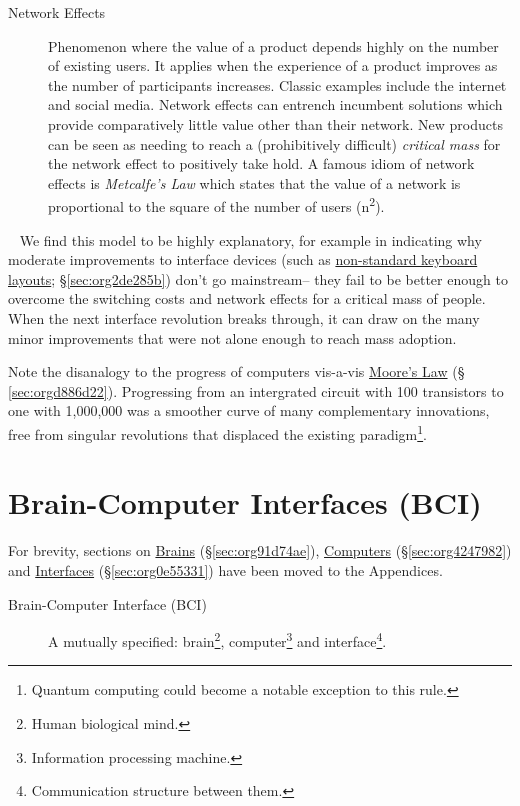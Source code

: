 \documentclass[logo,bsc,singlespacing,parskip]{infthesis}
\begin{document}
\begin{mdframed}
\begin{description}
\item[{Network Effects\label{network effects}}] Phenomenon where the value of a product depends highly on the number of existing users.
It applies when the experience of a product improves as the number of participants increases.
Classic examples include the internet and social media.
Network effects can entrench incumbent solutions which provide comparatively little value other than their network.
New products can be seen as needing to reach a (prohibitively difficult) \emph{critical mass} for the network effect to positively take hold.
A famous idiom of network effects is \emph{Metcalfe's Law} which states that the value of a network is proportional to the square of the number of users (n\textsuperscript{2}).
\end{description}
\end{mdframed}
~
We find this model to be highly explanatory, for example in indicating why moderate improvements to interface devices (such as \hyperref[sec:org2de285b]{non-standard keyboard layouts}; \S \ref{sec:org2de285b}) don't go mainstream-- they  fail to be better enough to overcome the switching costs and network effects for a critical mass of people.
When the next interface revolution breaks through, it can draw on the many minor improvements that were not alone enough to reach mass adoption.

Note the disanalogy to the progress of computers vis-a-vis \hyperref[sec:orgd886d22]{Moore's Law} (§ \ref{sec:orgd886d22}).
Progressing from an intergrated circuit with 100 transistors to one with 1,000,000 was a smoother curve of many complementary innovations, free from singular revolutions that displaced the existing paradigm\footnote{Quantum computing could become a notable exception to this rule.}.

\chapter{Brain-Computer Interfaces (BCI)}
\label{sec:orgd478241}
For brevity, sections on \hyperref[sec:org91d74ae]{Brains} (\S \ref{sec:org91d74ae}), \hyperref[sec:org4247982]{Computers} (\S \ref{sec:org4247982}) and \hyperref[sec:org0e55331]{Interfaces} (\S \ref{sec:org0e55331}) have been moved to the Appendices.

\begin{mdframed}
\begin{description}
\item[{\label{org89a0382}Brain-Computer Interface (BCI)}] A mutually specified: brain\footnote{Human biological mind.}, computer\footnote{Information processing machine.} and interface\footnote{Communication structure between them.}.
\end{description}
\end{mdframed}
\end{document}
